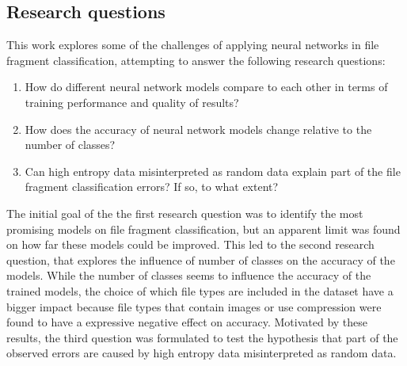\subsection{Research questions}
This work explores some of the challenges of applying neural networks in file fragment classification, attempting to answer the following research questions:

\begin{enumerate}[itemindent=\parindent,label=\textbf{Q\arabic*.}]

    \item How do different neural network models compare to each other in terms of training performance and quality of results?
    
    \item How does the accuracy of neural network models change relative to the number of classes?

    \item Can high entropy data misinterpreted as random data explain part of the file fragment classification errors? If so, to what extent?
\end{enumerate}

The initial goal of the the first research question was to identify the most promising models on file fragment classification, but an apparent limit was found on how far these models could be improved. This led to the second research question, that explores the influence of number of classes on the accuracy of the models. While the number of classes seems to influence the accuracy of the trained models, the choice of which file types are included in the dataset have a bigger impact because file types that contain images or use compression were found to have a expressive negative effect on accuracy. Motivated by these results, the third question was formulated to test the hypothesis that part of the observed errors are caused by high entropy data misinterpreted as random data.


